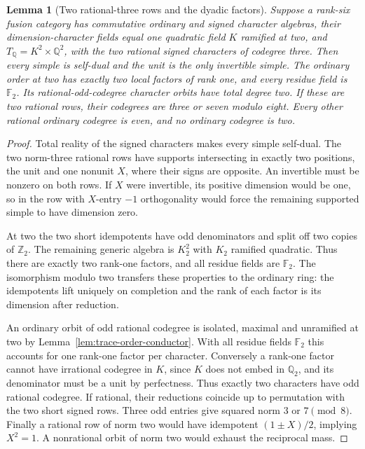 \documentclass[11pt,reqno]{amsart}
\newtheorem{lemma}[theorem]{Lemma}
\theoremstyle{remark}\newtheorem{remark}[theorem]{Remark}
\numberwithin{equation}{section}
\begin{document}
\begin{lemma}[Two rational-three rows and the dyadic factors]
\label{lem:r6-two-threes-dyadic}
Suppose a rank-six fusion category has commutative ordinary and
signed character algebras, their dimension-character fields equal
one quadratic field $K$ ramified at two, and
$T_{\mathbb Q}=K^2\times\mathbb Q^2$, with the two rational
signed characters of codegree three.
Then every simple is self-dual and the unit is the only invertible
simple. The ordinary order at two has exactly two local factors
of rank one, and every residue field is $\mathbb F_2$.
Its rational-odd-codegree character orbits have total degree two.
If these are two rational rows, their codegrees are three or seven
modulo eight. Every other rational ordinary codegree is even,
and no ordinary codegree is two.
\end{lemma}
\begin{proof}
Total reality of the signed characters makes every simple self-dual.
The two norm-three rational rows have supports intersecting in exactly
two positions, the unit and one nonunit $X$, where their signs are
opposite. An invertible must be nonzero on both rows. If $X$ were
invertible, its positive dimension would be one, so in the row with
$X$-entry $-1$ orthogonality would force the remaining supported
simple to have dimension zero.

At two the two short idempotents have odd denominators and split off
two copies of $\mathbb Z_2$. The remaining generic algebra is $K_2^2$
with $K_2$ ramified quadratic. Thus there are exactly two rank-one
factors, and all residue fields are $\mathbb F_2$. The isomorphism
modulo two transfers these properties to the ordinary ring: the
idempotents lift uniquely on completion and the rank of each factor
is its dimension after reduction.

An ordinary orbit of odd rational codegree is isolated, maximal and
unramified at two by Lemma~\ref{lem:trace-order-conductor}. With all residue fields $\mathbb F_2$ this
accounts for one rank-one factor per character. Conversely a rank-one
factor cannot have irrational codegree in $K$, since $K$ does not
embed in $\mathbb Q_2$, and its denominator must be a unit by
perfectness. Thus exactly two characters have odd rational codegree.
If rational, their reductions coincide up to permutation with the
two short signed rows. Three odd entries give squared norm $3$ or
$7\pmod8$. Finally a rational row of norm two would have idempotent
$(1\pm X)/2$, implying $X^2=1$. A nonrational orbit of norm two
would exhaust the reciprocal mass.
\end{proof}
\end{document}
